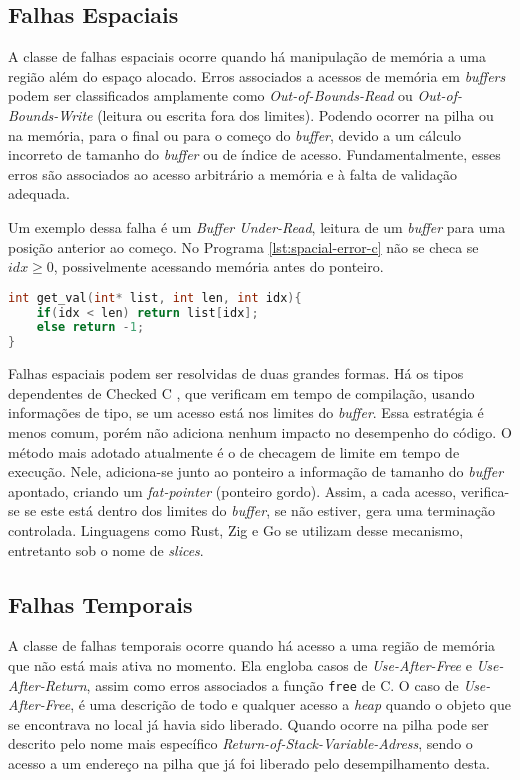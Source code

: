 \subsection{Falhas Espaciais}
\label{sec:mem-error:spacial}

A classe de falhas espaciais ocorre quando há manipulação de memória a uma região além do espaço alocado. Erros associados a acessos de memória em \emph{buffers} podem ser classificados amplamente como \emph{Out-of-Bounds-Read} ou \emph{Out-of-Bounds-Write} (leitura ou escrita fora dos limites). Podendo ocorrer na pilha ou na memória, para o final ou para o começo do \emph{buffer}, devido a um cálculo incorreto de tamanho do \emph{buffer} ou de índice de acesso.  Fundamentalmente, esses erros são associados ao acesso arbitrário a memória e à falta de validação adequada.

Um exemplo dessa falha é um \emph{Buffer Under-Read}, 
leitura de um \emph{buffer} para uma posição anterior ao começo. No Programa \ref{lst:spacial-error-c}
não se checa se $idx \ge 0$, possivelmente acessando memória antes do ponteiro.

\begin{lstlisting}[language=C ,label={lst:spacial-error-c}, caption=Exemplo de uma Falha Espacial]
int get_val(int* list, int len, int idx){
	if(idx < len) return list[idx];
 	else return -1;
}
\end{lstlisting}

Falhas espaciais podem ser resolvidas de duas grandes formas. Há os tipos dependentes de Checked C \cite{CHECKEDC}, que verificam em tempo de compilação, usando informações de tipo, se um acesso está nos limites do \emph{buffer}. Essa estratégia é menos comum, porém não adiciona nenhum impacto no desempenho do código. 
O método mais adotado atualmente é o de checagem de limite em tempo de execução. Nele, adiciona-se junto ao ponteiro a informação de tamanho do \emph{buffer} apontado, criando um \emph{fat-pointer} (ponteiro gordo). Assim, a cada acesso, verifica-se se este está dentro dos limites do \emph{buffer}, se não estiver, gera uma terminação controlada. Linguagens como Rust, Zig e Go se utilizam desse mecanismo, entretanto sob o nome de \emph{slices}.


\subsection{Falhas Temporais}
\label{sec:mem-error:temporal}

A classe de falhas temporais ocorre quando há acesso a uma região de memória que não está mais ativa no momento. Ela engloba casos de \emph{Use-After-Free} e \emph{Use-After-Return}, assim como erros associados a função \lstinline[language=C]|free| de C. O caso de \emph{Use-After-Free}, é uma descrição de todo e qualquer acesso a \emph{heap} quando o objeto que se encontrava no local já havia sido liberado. Quando ocorre na pilha pode ser descrito pelo nome mais específico \emph{Return-of-Stack-Variable-Adress}, sendo o acesso a um endereço na pilha que já foi liberado pelo desempilhamento desta.

